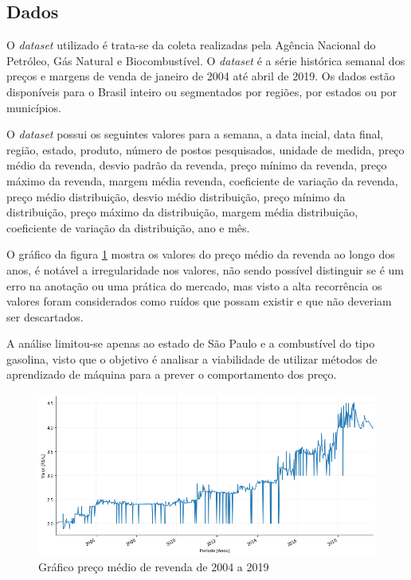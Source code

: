\subsection{Dados}

 O \textit{dataset} utilizado é trata-se da coleta realizadas pela Agência Nacional do Petróleo, Gás Natural e Biocombustível\cite{ANP}.
O \textit{dataset} é a série histórica semanal dos preços e margens de venda de janeiro de 2004 até abril de 2019. Os dados
estão disponíveis para o Brasil inteiro ou segmentados por regiões, por estados ou por 
municípios.

O \textit{dataset} possui os seguintes valores para a semana, a data incial, data final, região, estado,
produto, número de postos pesquisados, unidade de medida, preço médio da revenda,
desvio padrão da revenda, preço mínimo da revenda, preço máximo da revenda,
margem média revenda, coeficiente de variação da revenda, preço médio distribuição,
desvio médio distribuição, preço mínimo da distribuição, preço máximo da distribuição,
margem média distribuição, coeficiente de variação da distribuição, ano e mês.

O gráfico da figura \ref{dataset-graph} mostra os valores do preço médio da revenda ao longo dos anos, é notável a irregularidade nos valores, não sendo possível distinguir se é um erro na anotação ou uma prática do mercado, mas visto a alta recorrência os valores foram considerados como ruídos que possam existir e que não deveriam ser descartados.

A análise limitou-se apenas ao estado de São Paulo e a combustível do tipo gasolina, visto que o objetivo é analisar a viabilidade de utilizar métodos de aprendizado de máquina para a prever o comportamento dos preço.

\begin{figure}[!ht]
\centering
\caption{Gráfico preço médio de revenda de 2004 a 2019  }
\label{dataset-graph}
\includegraphics[width=1 \textwidth]{Figuras/precorevenda.png}
\end{figure}

